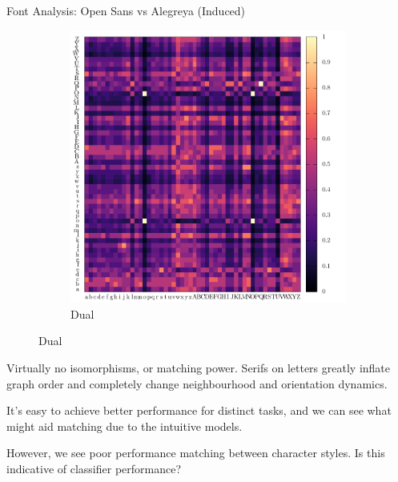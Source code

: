 \begin{frame}{Font Analysis: Open Sans vs Alegreya (Induced)}
\begin{figure}
\begin{subfigure}[b]{0.4\linewidth}
			\includegraphics[width=\linewidth, height=0.9\linewidth]{../tables/dual-alegreya-dejavu-sans/induced-conf-nrm.pdf}
			\caption{
				Dual
			}
		\end{subfigure}
	\end{figure}
	
	Virtually no isomorphisms, or matching power.
	Serifs on letters greatly inflate graph order and completely change neighbourhood and orientation dynamics.
\end{frame}

\begin{frame}[standout]
	It's \alert{easy to achieve better performance for distinct tasks}, and we can see what might aid matching due to the intuitive models.
	
	However, we see \alert{poor performance matching between character styles}.
	Is this indicative of classifier performance?
\end{frame}

